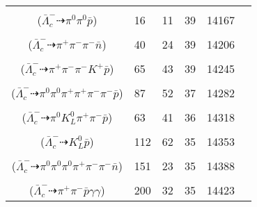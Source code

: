\documentclass[landscape]{article}
\newcounter{rownumbers}
\newcommand\rn{\stepcounter{rownumbers}\arabic{rownumbers}}
\newcommand{\EOL}{\\} %
\newcommand{\topoTags}[1]{#1} %
\begin{document}
\begin{longtable}{clcccc}
\rn & \makecell[l]{ $ 
\bar{\Lambda}_{c}^{-} \rightarrow \pi^{0} \bar{\Sigma}^{-} ,
\bar{\Sigma}^{-} \rightarrow \pi^{0} \bar{p} 
$ \\ ($
\bar{\Lambda}_{c}^{-} \dashrightarrow \pi^{0} \pi^{0} \bar{p} 
$) } & \topoTags{16 & 11 & }39 & 14167 \EOL

\rn & \makecell[l]{ $ 
\bar{\Lambda}_{c}^{-} \rightarrow \pi^{+} \pi^{-} \pi^{-} \bar{n} 
$ \\ ($
\bar{\Lambda}_{c}^{-} \dashrightarrow \pi^{+} \pi^{-} \pi^{-} \bar{n} 
$) } & \topoTags{40 & 24 & }39 & 14206 \EOL

\rn & \makecell[l]{ $ 
\bar{\Lambda}_{c}^{-} \rightarrow \pi^{+} \pi^{-} \pi^{-} K^{+} \bar{p} 
$ \\ ($
\bar{\Lambda}_{c}^{-} \dashrightarrow \pi^{+} \pi^{-} \pi^{-} K^{+} \bar{p} 
$) } & \topoTags{65 & 43 & }39 & 14245 \EOL

\rn & \makecell[l]{ $ 
\bar{\Lambda}_{c}^{-} \rightarrow \eta^{\prime} \bar{\Sigma}^{-} ,
\eta^{\prime} \rightarrow \pi^{+} \pi^{-} \eta ,
\bar{\Sigma}^{-} \rightarrow \pi^{0} \bar{p} ,
\eta \rightarrow \pi^{0} \pi^{+} \pi^{-} 
$ \\ ($
\bar{\Lambda}_{c}^{-} \dashrightarrow \pi^{0} \pi^{0} \pi^{+} \pi^{+} \pi^{-} \pi^{-} \bar{p} 
$) } & \topoTags{87 & 52 & }37 & 14282 \EOL

\rn & \makecell[l]{ $ 
\bar{\Lambda}_{c}^{-} \rightarrow \eta K^{0} \bar{p} ,
\eta \rightarrow \pi^{0} \pi^{+} \pi^{-} ,
K^{0} \rightarrow K_{L}^{0} 
$ \\ ($
\bar{\Lambda}_{c}^{-} \dashrightarrow \pi^{0} K_{L}^{0} \pi^{+} \pi^{-} \bar{p} 
$) } & \topoTags{63 & 41 & }36 & 14318 \EOL

\rn & \makecell[l]{ $ 
\bar{\Lambda}_{c}^{-} \rightarrow K^{0} \bar{p} ,
K^{0} \rightarrow K_{L}^{0} 
$ \\ ($
\bar{\Lambda}_{c}^{-} \dashrightarrow K_{L}^{0} \bar{p} 
$) } & \topoTags{112 & 62 & }35 & 14353 \EOL

\rn & \makecell[l]{ $ 
\bar{\Lambda}_{c}^{-} \rightarrow \eta^{\prime} \bar{\Sigma}^{-} ,
\eta^{\prime} \rightarrow \pi^{+} \pi^{-} \eta ,
\bar{\Sigma}^{-} \rightarrow \pi^{-} \bar{n} ,
\eta \rightarrow \pi^{0} \pi^{0} \pi^{0} 
$ \\ ($
\bar{\Lambda}_{c}^{-} \dashrightarrow \pi^{0} \pi^{0} \pi^{0} \pi^{+} \pi^{-} \pi^{-} \bar{n} 
$) } & \topoTags{151 & 23 & }35 & 14388 \EOL

\rn & \makecell[l]{ $ 
\bar{\Lambda}_{c}^{-} \rightarrow \eta K^{0} \bar{p} ,
\eta \rightarrow \gamma \gamma ,
K^{0} \rightarrow K_{S}^{0} ,
K_{S}^{0} \rightarrow \pi^{+} \pi^{-} 
$ \\ ($
\bar{\Lambda}_{c}^{-} \dashrightarrow \pi^{+} \pi^{-} \bar{p} \gamma \gamma 
$) } & \topoTags{200 & 32 & }35 & 14423 \EOL


\end{longtable}
\end{document}
